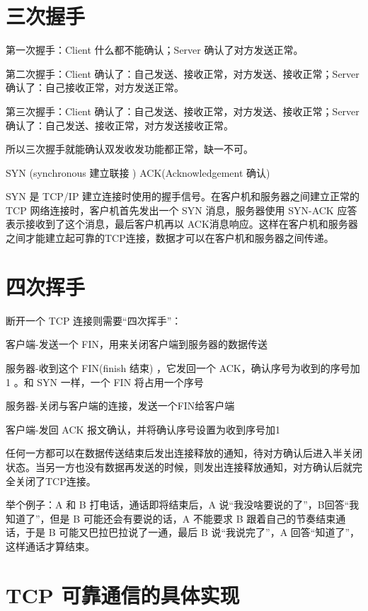 \section{三次握手}


第一次握手：Client 什么都不能确认；Server 确认了对方发送正常。

第二次握手：Client 确认了：自己发送、接收正常，对方发送、接收正常；Server 确认了：自己接收正常，对方发送正常。

第三次握手：Client 确认了：自己发送、接收正常，对方发送、接收正常；Server 确认了：自己发送、接收正常，对方发送接收正常。

所以三次握手就能确认双发收发功能都正常，缺一不可。


SYN (synchronous 建立联接 ) \qquad ACK(Acknowledgement 确认)

SYN 是 TCP/IP 建立连接时使用的握手信号。在客户机和服务器之间建立正常的 TCP 网络连接时，客户机首先发出一个 SYN 消息，服务器使用 SYN-ACK 应答表示接收到了这个消息，最后客户机再以 ACK消息响应。这样在客户机和服务器之间才能建立起可靠的TCP连接，数据才可以在客户机和服务器之间传递。

\section{四次挥手}

断开一个 TCP 连接则需要“四次挥手”：

客户端-发送一个 FIN，用来关闭客户端到服务器的数据传送

服务器-收到这个 FIN(finish 结束) ，它发回一个 ACK，确认序号为收到的序号加1 。和 SYN 一样，一个 FIN 将占用一个序号

服务器-关闭与客户端的连接，发送一个FIN给客户端

客户端-发回 ACK 报文确认，并将确认序号设置为收到序号加1


任何一方都可以在数据传送结束后发出连接释放的通知，待对方确认后进入半关闭状态。当另一方也没有数据再发送的时候，则发出连接释放通知，对方确认后就完全关闭了TCP连接。

举个例子：A 和 B 打电话，通话即将结束后，A 说“我没啥要说的了”，B回答“我知道了”，但是 B 可能还会有要说的话，A 不能要求 B 跟着自己的节奏结束通话，于是 B 可能又巴拉巴拉说了一通，最后 B 说“我说完了”，A 回答“知道了”，这样通话才算结束。

\section{TCP 可靠通信的具体实现}

